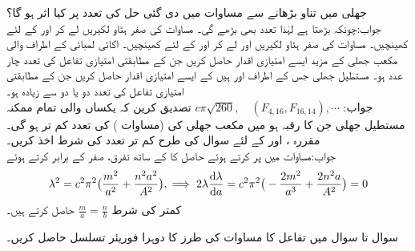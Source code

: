 \quad
جھلی میں تناو بڑھانے سے مساوات  میں دی گئی حل کی تعدد پر کیا اثر ہو گا؟\\
جواب:\quad چونکہ  بڑھتا ہے لہٰذا تعدد بھی بڑھے گی۔
\quad
مساوات  کی صفر ہٹاو لکیریں  لے کر   اور  کے لئے کھینچیں۔ 
\quad
مساوات  کی صفر ہٹاو لکیریں  اور  لے کر   اور  کے لئے کھینچیں۔ 
\quad
اکائی لمبائی کے اطراف والی مکعب جھلی کے مزید ایسے امتیازی اقدار حاصل کریں جن کے مطابقتی امتیازی تفاعل کی تعدد چار عدد ہو۔
\quad
مستطیل جھلی جس کے اطراف  اور  ہیں کے ایسے امتیازی اقدار حاصل کریں جن کے مطابقتی امتیازی تفاعل کی تعدد دو یا دو سے زیادہ ہو۔\\
جواب:\quad
$c\pi\sqrt{260}, \quad (F_{4,16},F_{16,14}),\cdots $
\quad
تصدیق کرین کہ یکساں  والی تمام ممکنہ مستطیل جھلی جن کا رقبہ  ہو میں مکعب جھلی  کی  (مساوات ) کی تعدد کم تر ہو گی۔
\quad
مقررہ ،  اور  کے لئے  سوال  کی طرح کم تر تعدد کی شرط اخذ کریں۔\\
جواب:\quad مساوات  میں  پر کرتے ہوئے حاصل  کا  کے ساتھ تفرق، صفر کے برابر کرتے ہوئے
\begin{align*}
\lambda^2=c^2\pi^2\big(\frac{m^2}{a^2}+\frac{n^2a^2}{A^2}\big),\implies 2\lambda \frac{\dif \lambda}{\dif a}=c^2\pi^2\big(-\frac{2m^2}{a^3}+\frac{2n^2a}{A^2}\big)=0
\end{align*}
 کمتر  کی شرط 
$\tfrac{m}{a}=\tfrac{n}{b}$
حاصل کرتے ہیں۔

سوال  تا سوال  میں تفاعل  کا مساوات  کی طرز کا دوہرا فوریئر تسلسل حاصل کریں۔

